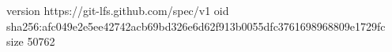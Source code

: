 version https://git-lfs.github.com/spec/v1
oid sha256:afc049e2e5ee42742acb69bd326e6d62f913b0055dfc3761698968809e1729fc
size 50762
